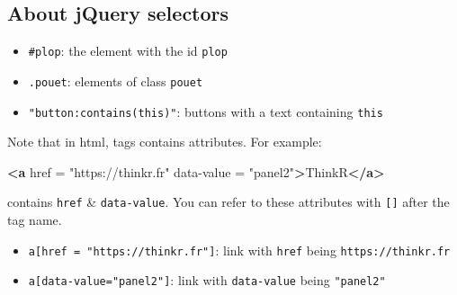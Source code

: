 \documentclass[]{book}
\newenvironment{Shaded}{\begin{snugshade}}{\end{snugshade}}
\newcommand{\KeywordTok}[1]{\textcolor[rgb]{0.13,0.29,0.53}{\textbf{#1}}}
\newcommand{\NormalTok}[1]{#1}
\newcommand{\OtherTok}[1]{\textcolor[rgb]{0.56,0.35,0.01}{#1}}
\newcommand{\StringTok}[1]{\textcolor[rgb]{0.31,0.60,0.02}{#1}}
\begin{document}
\hypertarget{about-jquery-selectors}{%
\subsection{About jQuery selectors}\label{about-jquery-selectors}}

\begin{itemize}
\item
  \texttt{\#plop}: the element with the id \texttt{plop}
\item
  \texttt{.pouet}: elements of class \texttt{pouet}
\item
  \texttt{"button:contains(\textquotesingle{}this\textquotesingle{})"}: buttons with a text containing \texttt{\textquotesingle{}this\textquotesingle{}}
\end{itemize}

Note that in html, tags contains attributes. For example:

\begin{Shaded}
\begin{Highlighting}[]
\KeywordTok{<a}\OtherTok{ href} \OtherTok{=} \StringTok{"https://thinkr.fr"}\OtherTok{ data-value} \OtherTok{=} \StringTok{"panel2"}\KeywordTok{>}\NormalTok{ThinkR}\KeywordTok{</a>}
\end{Highlighting}
\end{Shaded}

contains \texttt{href} \& \texttt{data-value}. You can refer to these attributes with \texttt{{[}{]}} after the tag name.

\begin{itemize}
\item
  \texttt{a{[}href\ =\ "https://thinkr.fr"{]}}: link with \texttt{href} being \texttt{https://thinkr.fr}
\item
  \texttt{a{[}data-value="panel2"{]}}: link with \texttt{data-value} being \texttt{"panel2"}
\end{itemize}
\end{document}
